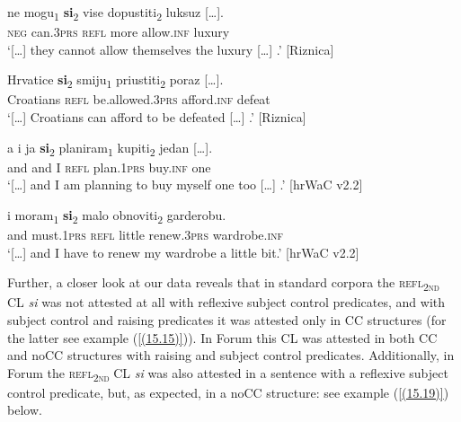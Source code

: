 \begin{exe}\ex\label{(15.15)}
\gll [\dots] ne mogu\textsubscript{1} \textbf{si}\textsubscript{2} vise dopustiti\textsubscript{2} {luksuz [\dots].} \\
{} \textsc{neg} can.3\textsc{prs} \textsc{refl} more allow.\textsc{inf} luxury  \\
\glt ‘[\dots] they cannot allow themselves the luxury [\dots] .’
\hfill [Riznica]

\ex\label{(15.16)}
\gll [\dots] Hrvatice \textbf{si}\textsubscript{2} smiju\textsubscript{1} priustiti\textsubscript{2} {poraz [\dots].} \\
{} Croatians \textsc{refl} be.allowed.3\textsc{prs} afford.\textsc{inf} defeat \\
\glt  ‘[\dots] Croatians can afford to be defeated [\dots] .’
\hfill [Riznica]

\ex\label{(15.17)}
\gll [\dots] a i ja \textbf{si}\textsubscript{2} planiram\textsubscript{1} kupiti\textsubscript{2} {jedan [\dots].} \\
{} and and I \textsc{refl} plan.1\textsc{prs} buy.\textsc{inf} one \\
\glt ‘[\dots] and I am planning to buy myself one too [\dots] .’
\hfill [hrWaC v2.2]

\ex\label{(15.18)}
\gll [\dots] i moram\textsubscript{1} \textbf{si}\textsubscript{2} malo obnoviti\textsubscript{2} garderobu. \\
 {} and must.1\textsc{prs} \textsc{refl} little renew.3\textsc{prs} wardrobe.\textsc{inf} \\
\glt ‘[\dots] and I have to renew my wardrobe a little bit.’
\hfill [hrWaC v2.2]
\end{exe}

\noindent Further, a closer look at our data reveals that in standard corpora the \textsc{refl\textsubscript{2nd}} CL \textit{si} was not attested at all with reflexive subject control predicates, and with subject control and raising predicates it was attested only in CC structures (for the latter see example (\ref{(15.15)})). In Forum this CL was attested in both CC and noCC structures with raising and subject control predicates. Additionally, in Forum the \textsc{refl\textsubscript{2nd}} CL \textit{si} was also attested in a sentence with a reflexive subject control predicate, but, as expected, in a noCC structure: see example (\ref{(15.19)}) below. 


